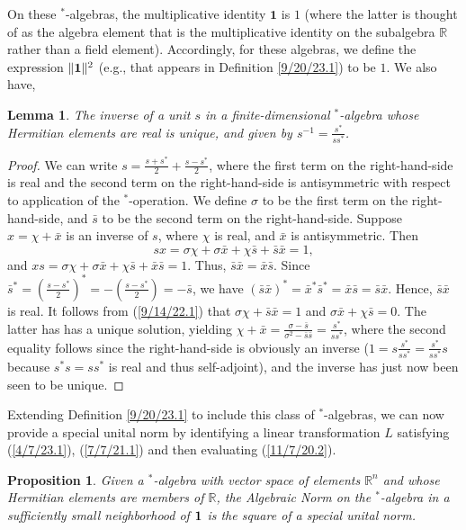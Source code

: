 \documentclass{amsart}
\numberwithin{equation}{section}
\newtheorem{lemma}[theorem]{Lemma}
\newtheorem{proposition}[theorem]{Proposition}
\theoremstyle{definition}
\numberwithin{theorem}{section}
\begin{document}
On these $^*$-algebras, the multiplicative identity $\mathbf{1}$ is $1$ (where the latter is thought of as the algebra element that is the multiplicative identity on the subalgebra $\mathbb{R}$ rather than a field element).  Accordingly, for these algebras, we define the expression $\|{\bf 1}\|^2$ (e.g., that appears in Definition \ref{9/20/23.1}) to be $1$.  We also have,

\begin{lemma}\label{9/14/22.2} The inverse of a unit $s$ in a finite-dimensional $^*$-algebra whose Hermitian elements are real is unique, and given by $s^{-1}=\frac{s^*}{ss^*}$.\end{lemma}

\begin{proof} 
We can write $s=\frac{s+s^*}{2} +\frac{s-s^*}{2}$, where the first  term on the right-hand-side is real and the second term on the right-hand-side is antisymmetric with respect to application of the $^*$-operation.  We define $\sigma$ to be the first term on the right-hand-side, and $\bar{s}$ to be the second term on the right-hand-side.  Suppose $x = \chi + \bar{x}$ is an inverse of $s$, where $\chi$ is real, and $\bar{x}$ is antisymmetric. Then \begin{equation}\label{9/14/22.1} sx = \sigma\chi + \sigma\bar{x}+\chi\bar{s} + \bar{s}\bar{x} = 1,\end{equation} and $xs = \sigma\chi + \sigma\bar{x}+\chi\bar{s} + \bar{x}\bar{s} = 1$.  Thus, $\bar{s}\bar{x} = \bar{x}\bar{s}$.  Since $\bar{s}^* = (\frac{s-s^*}{2})^* = -(\frac{s-s^*}{2}) = -\bar{s}$, we have $(\bar{s}\bar{x})^* = \bar{x}^*\bar{s}^* = \bar{x}\bar{s} = \bar{s}\bar{x}$.  Hence, $\bar{s}\bar{x}$ is real.  It follows from (\ref{9/14/22.1}) that $\sigma\chi+\bar{s}\bar{x} =1$ and $\sigma\bar{x}+\chi\bar{s} = 0$.  The latter has has a unique solution, yielding $\chi+\bar{x} = \frac{\sigma-\bar{s}}{\sigma^2-\bar{s}\bar{s}} = \frac{s^*}{ss^*}$, where the second equality follows since the right-hand-side is obviously an inverse ($1=s\frac{s^*}{ss^*} = \frac{s^*}{ss^*}s$ because $s^*s=ss^*$ is real and thus self-adjoint), and the inverse has just now been seen to be unique.
\end{proof}

Extending Definition \ref{9/20/23.1} to include this class of $^*$-algebras, we can now provide a special unital norm  by identifying a linear transformation $L$ satisfying (\ref{4/7/23.1}), (\ref{7/7/21.1}) and then evaluating (\ref{11/7/20.2}).  
 
 \begin{proposition}\label{1/11/22.1} Given a $^*$-algebra with vector space of elements $\mathbb{R}^n$ and whose Hermitian elements are members of $\mathbb{R}$, the Algebraic Norm on the $^*$-algebra in a sufficiently small neighborhood of ${\bf 1}$ is the square of a special unital norm. \end{proposition}
\end{document}
